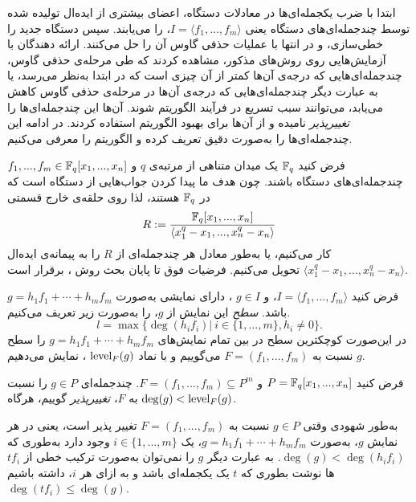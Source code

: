 ابتدا با ضرب یکجمله‌ای‌ها در معادلات دستگاه، اعضای بیشتری از ایده‌ال تولیده شده توسط چندجمله‌ای‌های دستگاه یعنی 
$I = \langle f_{1},...,f_{m}\rangle$،
را می‌یابند. سپس دستگاه جدید را خطی‌سازی، و در انتها با عملیات حذفی گاوس  آن را حل می‌کنند.  ارائه دهندگان
با آزمایش‌هایی روی روش‌های مذکور، مشاهده کردند که طی مرحله‌ی حذفی گاوس، چندجمله‌ای‌هایی که درجه‌ی آن‌ها کمتر از آن چیزی است که در ابتدا به‌نظر می‌رسد، یا به عبارت دیگر چندجمله‌ای‌هایی که درجه‌ی آن‌ها در مرحله‌ی حذفی گاوس کاهش می‌یابد، می‌توانند سبب تسریع در فرآیند الگوریتم شوند. آن‌ها این چندجمله‌ای‌ها را 
\textit{تغییر‌پذیر}
نامیده و از آن‌ها برای بهبود الگوریتم 
استفاده کردند. در ادامه این چندجمله‌ای‌ها را به‌صورت دقیق تعریف کرده و الگوریتم 
را معرفی می‌کنیم. 

فرض کنید 
$\mathbb{F}_{q}$
یک میدان متناهی از مرتبه‌ی 
$q$
و 
$f_{1},...,f_{m}\in\mathbb{F}_{q}[x_{1},...,x_{n}]$
چندجمله‌ای‌های دستگاه باشند. چون هدف ما پیدا کردن جواب‌هایی از دستگاه است که در 
$\mathbb{F}_{q}$
هستند، لذا روی حلقه‌ی خارج قسمتی 
$$R:=\frac{\mathbb{F}_{q}[x_{1},...,x_{n}]}{\langle x_{1}^{q} - x_{1},...,x_{n}^{q} - x_{n}\rangle}$$
کار می‌کنیم، یا به‌طور معادل هر  چندجمله‌ای از 
$R$
را به پیمانه‌ی ایده‌ال 
$\langle x_{1}^{q} - x_{1},...,x_{n}^{q} - x_{n}\rangle$
تحویل می‌کنیم. فرضیات فوق تا پایان بحث روش 
، برقرار است. 
\begin{definition}
فرض کنید 
$I = \langle f_{1},...,f_{m} \rangle $،
و 
$g\in I$
، دارای نمایشی به‌صورت 
$g = h_{1}f_{1} +\cdots + h_{m}f_{m}$
باشد.
\textit{سطح}
 این نمایش  از 
 $g$، 
 را به‌صورت زیر تعریف می‌کنیم.
$$l = \max\{\deg(h_{i}f_{i})| \ i\in\{1,...,m\}, h_{i}\neq 0 \}.$$
در این‌صورت کوچکترین سطح در بین تمام نمایش‌های 
$g = h_{1}f_{1} +\cdots +h_{m}f_{m}$
را سطح 
$g$
نسبت به 
$F = (f_{1},...,f_{m})$
می‌گوییم و با نماد 
$\operatorname{\mathrm{level}}_{F}(g)$
، نمایش می‌دهیم. 
\end{definition}

\begin{definition}
فرض کنید 
$P = \mathbb{F}_{q}[x_{1},...,x_{n}]$
و 
$F = (f_{1},...,f_{m})\subseteq P^{m}$.
چندجمله‌ای 
$g\in P$
را نسبت به 
$F$،
\textit{تغییر‌پذیر}
گوییم، هرگاه 
$\deg(g) < \operatorname{\mathrm{level}}_{F}(g)$.

\end{definition}
به‌طور شهودی وقتی 
$g\in P$
نسبت به 
$F = (f_{1},...,f_{m})$
تغییر پذیر است، یعنی در هر نمایش 
$g$،
 به‌صورت 
$g = h_{1}f_{1}+\cdots +h_{m}f_{m}$،
 یک 
$i \in\{1,...,m\}$
وجود دارد به‌طوری که 
$\deg(g) < \deg(h_{i}f_{i})$.
به عبارت دیگر 
$g$
را نمی‌توان به‌صورت ترکیب خطی از 
$t f_{i}$
ها نوشت بطوری که 
$t$
یک یکجمله‌ای باشد و به ازای هر 
$i$،
 داشته باشیم 
$\deg(t f_{i})\leq \deg(g)$.

